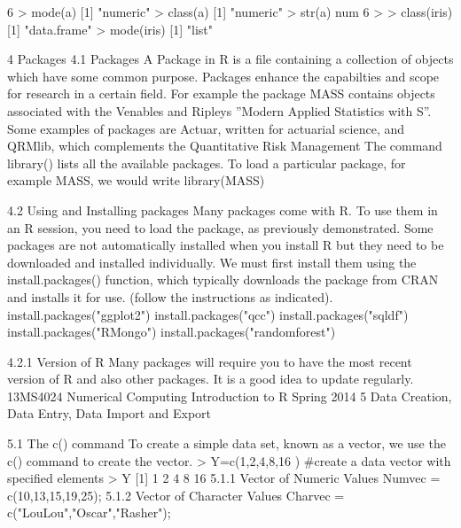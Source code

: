 \documentclass{beamer}
\begin{document}
\begin{frame}[1] 6
> mode(a)
[1] "numeric"
> class(a)
[1] "numeric"
> str(a)
num 6
>
> class(iris)
[1] "data.frame"
> mode(iris)
[1] "list"
\end{frame}
\begin{frame}
4 Packages
4.1 Packages
A Package in R is a file containing a collection of objects which have some common purpose.
Packages enhance the capabilties and scope for research in a certain field. For example the
package MASS contains objects associated with the Venables and Ripleys ”Modern Applied
Statistics with S”. Some examples of packages are Actuar, written for actuarial science, and
QRMlib, which complements the Quantitative Risk Management The command library()
lists all the available packages. To load a particular package, for example MASS, we would
write
library(MASS)

\end{frame}
\begin{frame}
4.2 Using and Installing packages
Many packages come with R. To use them in an R session, you need to load the package, as
previously demonstrated.
Some packages are not automatically installed when you install R but they need to be downloaded
and installed individually. We must first install them using the install.packages()
function, which typically downloads the package from CRAN and installs it for use. (follow the
instructions as indicated).
install.packages("ggplot2")
install.packages("qcc")
install.packages("sqldf")
install.packages("RMongo")
install.packages("randomforest")
\end{frame}
\begin{frame}
4.2.1 Version of R
Many packages will require you to have the most recent version of R and also other packages.
It is a good idea to update regularly.
13MS4024 Numerical Computing Introduction to R Spring 2014
5 Data Creation, Data Entry, Data Import and Export
\end{frame}
\begin{frame}
5.1 The c() command
To create a simple data set, known as a vector, we use the c() command to create the vector.
> Y=c(1,2,4,8,16 ) #create a data vector with specified elements
> Y
[1] 1 2 4 8 16
5.1.1 Vector of Numeric Values
Numvec = c(10,13,15,19,25);
5.1.2 Vector of Character Values
Charvec = c("LouLou","Oscar","Rasher");

\end{frame}
\end{document}
